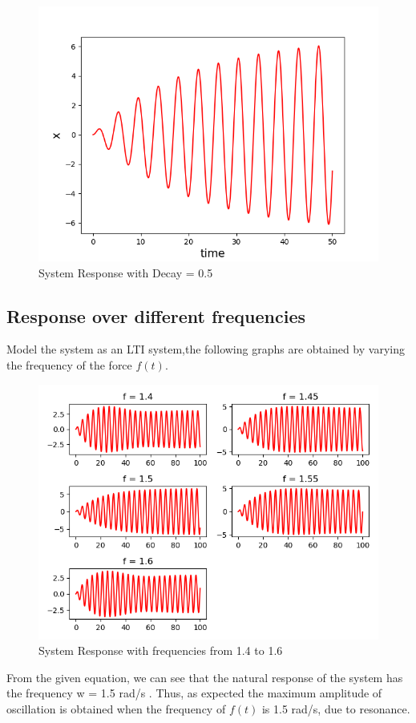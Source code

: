 \documentclass{article}
\begin{document}
\begin{figure}[h!]
\centering
\includegraphics[scale=0.6]{fig1.png}
\caption{System Response with Decay = 0.5}
\label{fig:System Response with Decay = 0.05}
\end{figure}

\clearpage
\subsection{Response over different frequencies}
Model the system as an LTI system,the following graphs are obtained
by varying the frequency of the force $f(t)$.
\begin{figure}[h!]
\centering
\includegraphics[]{fig2.png}
\caption{System Response with frequencies from 1.4 to 1.6}
\label{fig:System Response with frequencies from 1.4 to 1.6}
\end{figure}
From the given equation, we can see that the natural response of the system has the frequency w = 1.5 rad/s . Thus, as expected the maximum amplitude of oscillation is obtained when the frequency of $f(t)$ is 1.5 rad/s, due to resonance.
\clearpage
\end{document}

